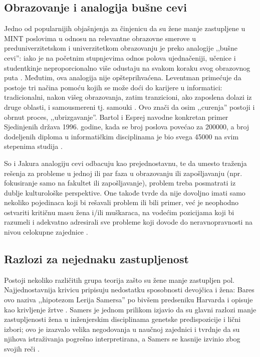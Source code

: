 \subsection{Obrazovanje i analogija bušne cevi}
Jedno od popularnijih objašnjenja za činjenicu da su žene manje zastupljene u MINT poslovima u odnosu na relevantne obrazovne smerove u preduniverzitetskom i univerzitetkom obrazovanju je preko analogije ,,bušne cevi'': iako je na početnim stupnjevima odnos polova ujednačeniji, učenice i studentkinje neproporcionalno više odustaju na svakom koraku svog obrazovnog puta \cite{jacobs, soe-yakura, blickenstaff}. Međutim, ova analogija nije opšteprihvaćena. Leventman primećuje da postoje tri načina pomoću kojih se može doći do karijere u informatici: tradicionalni, nakon višeg obrazovanja, zatim tranzicioni, ako zaposlena dolazi iz druge oblasti, i samousmereni tj. samouki \cite{leventman}. Ovo znači da osim ,,curenja'' postoji i obrnut proces, ,,ubrizgavanje''. Bartol i Esprej navodne konkretan primer Sjedinjenih država 1996. godine, kada se broj poslova povećao za 200000, a broj dodeljenih diploma u informatičkim disciplinama je bio svega 45000 na svim stepenima studija \cite{bartol}.

So i Jakura analogiju cevi odbacuju kao prejednostavnu, te da umesto traženja rešenja za probleme u jednoj ili par faza u obrazovanju ili zapošljavanju (npr. fokusiranje samo na fakultet ili zapošljavanje), problem treba posmatrati iz dublje kulturološke perspektive. One takođe tvrde da nije dovoljno imati samo nekoliko pojedinaca koji bi rešavali problem ili bili primer, već je neophodno ostvariti kritičnu masu žena i/ili muškaraca, na vodećim pozicijama koji bi razumeli i adekvatno adresirali sve probleme koji dovode do neravnopravnosti na nivou celokupne zajednice \cite{soe-yakura}.

\subsection{Razlozi za nejednaku zastupljenost} 
Postoji nekoliko različitih grupa teorija zašto su žene manje zastupljen pol. Najjednostavnija krivicu pripisuju nedostatku sposobnosti devojčica i žena: Bares ovo naziva ,,hipotezom Lerija Samersa'' po bivšem predseniku Harvarda i opisuje kao krivljenje žrtve \cite{barres}. Samers je jednom prilikom izjavio da su glavni razlozi manje zastupljenosti žena u inženjerskim disciplinama genetske predispozicije i lični izbori; ovo je izazvalo velika negodovanja u naučnoj zajednici i tvrdnje da su njihova istraživanja pogrešno interpretirana, a Samers se kasnije izvinio zbog svojih reči \cite{lawler}.

